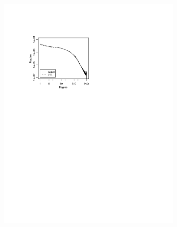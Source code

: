 \documentclass[11pt,a4paper]{article}
\begin{document}
\begin{figure}[htbp]
	\centering
	\begin{subfigure}
		\centering
		\includegraphics[scale=0.95]{fb_degree.pdf}
	\end{subfigure}
	\begin{subfigure}
		\centering

\end{subfigure}
\end{figure}
\end{document}
